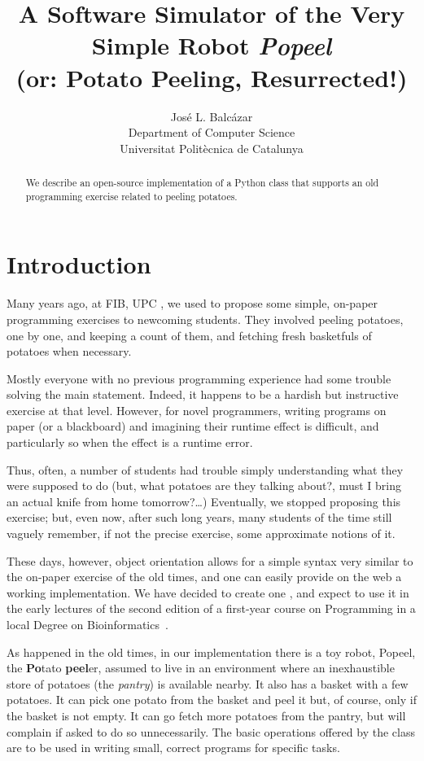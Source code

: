 \documentclass[12pt]{article}
\title{A Software Simulator of the Very Simple Robot \emph{Popeel}%
\\ \medskip\Large
(or: Potato Peeling, Resurrected!)
}
\author{Jos\'e L. Balc\'azar \\
{Department of Computer Science} \\
{Universitat Polit\`ecnica de Catalunya}}
\begin{document}
\maketitle

\begin{abstract}
We describe an open-source implementation of a
Python class that supports an old programming
exercise related to peeling potatoes.
\end{abstract}


\section{Introduction}%

Many years ago, at FIB, UPC \cite{FIB}, we used to 
propose some simple, on-paper programming exercises 
to newcoming students. They involved peeling potatoes, 
one by one, and keeping a count of them, and fetching 
fresh basketfuls of potatoes when necessary. 

Mostly everyone with no previous programming 
experience had some trouble solving the main
statement. Indeed, it happens to be a hardish but 
instructive exercise at that level. However, 
for novel programmers, writing programs on paper 
(or a blackboard) and imagining their runtime effect 
is difficult, and particularly so when the effect 
is a runtime error.

Thus, often, a number of students had trouble simply understanding 
what they were supposed to do \cite{PBblog} (but, what 
potatoes are they talking about?, must I bring an actual 
knife from home tomorrow?\dots) Eventually, we stopped 
proposing this exercise; but, even now, after such long years,
many students of the time still vaguely remember, 
if not the precise exercise, some approximate
notions of it.

These days, however, object orientation allows for 
a simple syntax very similar to the on-paper exercise 
of the old times, and one can easily provide on the 
web a working implementation. We have decided
to create one \cite{Popeel}, and expect to use it in the early
lectures of the second edition of a first-year
course on Programming \cite{mireport} in a local 
Degree on Bioinformatics~\cite{BDBI}.

As happened in the old times, in our implementation
there is a toy robot, Popeel, the 
{\bf Po}tato {\bf peel}er, assumed to live in an 
environment where an inexhaustible store of potatoes 
(the \emph{pantry})
is available nearby. It also has a basket with a few 
potatoes. It can pick one potato from the basket and 
peel it but, of course, only if the basket is not empty. It can go 
fetch more potatoes from the pantry, 
but will complain 
if asked to do so unnecessarily. The basic operations
offered by the class are to be used in writing small,
correct programs for specific tasks.
\end{document}
